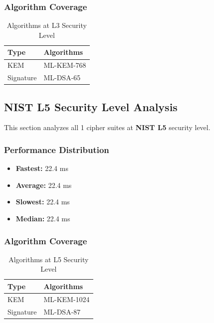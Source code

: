 \documentclass[11pt,a4paper,twoside]{article}
\begin{document}
\subsubsection{Algorithm Coverage}

\begin{table}[H]
\centering
\caption{Algorithms at L3 Security Level}
\begin{tabular}{l l}
\toprule
\textbf{Type} & \textbf{Algorithms} \\
\midrule
KEM & ML-KEM-768 \\
Signature & ML-DSA-65 \\
\bottomrule
\end{tabular}
\end{table}

\subsection{NIST L5 Security Level Analysis}
\label{sec:level-l5}

This section analyzes all 1 cipher suites at \textbf{NIST L5} security level.

\subsubsection{Performance Distribution}

\begin{itemize}
    \item \textbf{Fastest:} 22.4 ms
    \item \textbf{Average:} 22.4 ms
    \item \textbf{Slowest:} 22.4 ms
    \item \textbf{Median:} 22.4 ms
\end{itemize}

\subsubsection{Algorithm Coverage}

\begin{table}[H]
\centering
\caption{Algorithms at L5 Security Level}
\begin{tabular}{l l}
\toprule
\textbf{Type} & \textbf{Algorithms} \\
\midrule
KEM & ML-KEM-1024 \\
Signature & ML-DSA-87 \\
\bottomrule
\end{tabular}
\end{table}
\end{document}
